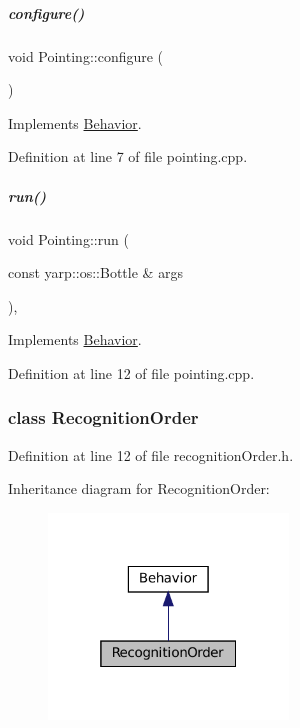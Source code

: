 \mbox{\label{group__behaviorManager_a1681f79ff201a977a2d9124026d6cac8}} 
\subparagraph{\texorpdfstring{configure()}{configure()}}
{\footnotesize\ttfamily void Pointing\+::configure (\begin{DoxyParamCaption}{ }\end{DoxyParamCaption})\hspace{0.3cm}{\ttfamily [virtual]}}



Implements \hyperlink{group__behaviorManager_a30484d4d6de3c0689de4f60da3efbab8}{Behavior}.



Definition at line 7 of file pointing.\+cpp.

\mbox{\label{group__behaviorManager_a6f1a7b52f3c846009e6b510dbb728011}} 
\subparagraph{\texorpdfstring{run()}{run()}}
{\footnotesize\ttfamily void Pointing\+::run (\begin{DoxyParamCaption}\item[{const yarp\+::os\+::\+Bottle \&}]{args }\end{DoxyParamCaption})\hspace{0.3cm}{\ttfamily [protected]}, {\ttfamily [virtual]}}



Implements \hyperlink{group__behaviorManager_a7dfd81b30f9ddf1864093626650751c3}{Behavior}.



Definition at line 12 of file pointing.\+cpp.

\label{classRecognitionOrder}
\subsubsection{class Recognition\+Order}


Definition at line 12 of file recognition\+Order.\+h.



Inheritance diagram for Recognition\+Order\+:
\nopagebreak
\begin{figure}[H]
\begin{center}
\leavevmode
\includegraphics[width=181pt]{classRecognitionOrder__inherit__graph}
\end{center}
\end{figure}
